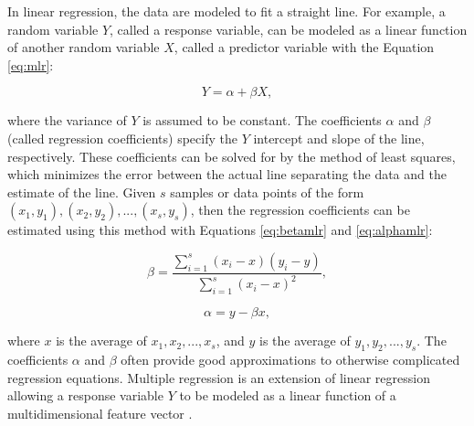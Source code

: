 In linear regression, the data are modeled to fit a straight line. For example, a random variable $Y$, called a response variable, can be modeled as a linear function of another random variable $X$, called a predictor variable with the Equation \ref{eq:mlr}:

\begin{equation}
\label{eq:mlr}
Y = \alpha + \beta X,
\end{equation}

where the variance of $Y$ is assumed to be constant. The coefficients $\alpha$ and $\beta$ (called regression coefficients) specify the $Y$ intercept and slope of the line, respectively. These coefficients can be solved for by the method of least squares, which minimizes the error between the actual line separating the data and the estimate of the line. Given $s$ samples or data points of the form $(x_1,y_1), (x_2,y_2), ..., (x_s,y_s)$, then the regression coefficients can be estimated using this method with Equations \ref{eq:betamlr} and \ref{eq:alphamlr}:

\begin{equation}
\label{eq:betamlr}
\beta = \frac{\sum\limits_{i=1}^{s} (x_i - x) (y_i - y) }{\sum\limits_{i=1}^{s} (x_i - x)^2},
\end{equation}

\begin{equation}
\label{eq:alphamlr}
\alpha = y - \beta x,
\end{equation}

where $x$ is the average of $x_1,x_2,...,x_s$, and $y$ is the average of $y_1,y_2,...,y_s$. The coefficients $\alpha$ and $\beta$ often provide good approximations to otherwise complicated regression equations. Multiple regression is an extension of linear regression allowing a response variable $Y$ to be modeled as a linear function of a multidimensional feature vector \cite{han2006data}.

